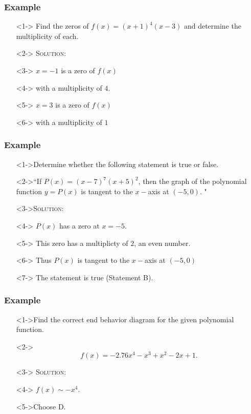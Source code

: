 \documentclass{beamer}
\begin{document}
\begin{frame}
  \frametitle{Example}
    \begin{enumerate}
      \item[]<1-> Find the zeros of $f(x)=(x+1)^{4}(x-3)$ and determine the multiplicity of each.
      \item[]<2-> \textsc{Solution:}
      \item[]<3-> $x=-1$ is a zero of $f(x)$
      \item[]<4-> with a multiplicity of $4$.
      \item[]<5-> $x=3$ is a zero of $f(x)$
      \item[]<6-> with a multiplicity of $1$
    \end{enumerate}
\end{frame}

\begin{frame}
  \frametitle{Example}
  \begin{enumerate}
    \item[]<1->Determine whether the following statement is true or false.
    \item[]<2->``If $P(x)=(x-7)^{7}(x+5)^{2}$, then the graph of the polynomial function $y=P(x)$ is tangent to the $x-$axis at $(-5,0)$. "
    \item[]<3->\textsc{Solution:}
    \item[]<4-> $P(x)$ has a zero at $x=-5$.
    \item[]<5-> This zero has a multiplicty of $2$, an even number.
    \item[]<6-> Thus $P(x)$ is tangent to the $x-$axis at $(-5,0)$
    \item[]<7-> The statement is true (Statement B).
  \end{enumerate}
\end{frame}

\begin{frame}
  \frametitle{Example}
  \begin{enumerate}
    \item[]<1->Find the correct end behavior diagram for the given polynomial function.
    \item[]<2-> \[ f(x)=-2.76x^{4}-x^{3}+x^{2}-2x+1. \]
    \item[]<3-> \textsc{Solution:}
    \item[]<4-> $f(x) \sim -x^{4}$.
    \item[]<5->Choose D.  
  \end{enumerate}
\end{frame}
\end{document}
